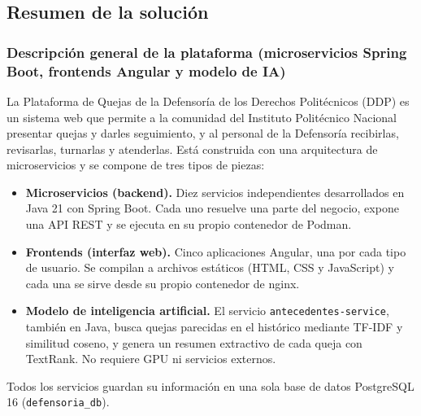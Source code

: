 \subsection{Resumen de la solución}\label{sec:1_1_resumen_solucion}

\subsubsection{Descripción general de la plataforma (microservicios Spring Boot, frontends Angular y modelo de IA)}
La Plataforma de Quejas de la Defensoría de los Derechos Politécnicos (DDP) es un sistema web que permite a la comunidad del Instituto Politécnico Nacional presentar quejas y darles seguimiento, y al personal de la Defensoría recibirlas, revisarlas, turnarlas y atenderlas. Está construida con una arquitectura de microservicios y se compone de tres tipos de piezas:

\begin{itemize}
  \item \textbf{Microservicios (backend).} Diez servicios independientes desarrollados en Java 21 con Spring Boot. Cada uno resuelve una parte del negocio, expone una API REST y se ejecuta en su propio contenedor de Podman.
  \item \textbf{Frontends (interfaz web).} Cinco aplicaciones Angular, una por cada tipo de usuario. Se compilan a archivos estáticos (HTML, CSS y JavaScript) y cada una se sirve desde su propio contenedor de nginx.
  \item \textbf{Modelo de inteligencia artificial.} El servicio \texttt{antecedentes-service}, también en Java, busca quejas parecidas en el histórico mediante TF-IDF y similitud coseno, y genera un resumen extractivo de cada queja con TextRank. No requiere GPU ni servicios externos.
\end{itemize}

Todos los servicios guardan su información en una sola base de datos PostgreSQL 16 (\texttt{defensoria\_db}).

